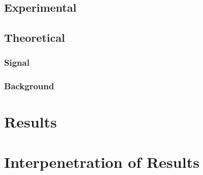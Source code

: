 \subsection{Experimental}
\subsection{Theoretical}
\subsubsection{Signal}
\subsubsection{Background}

\section{Results}
\section{Interpenetration of Results}
